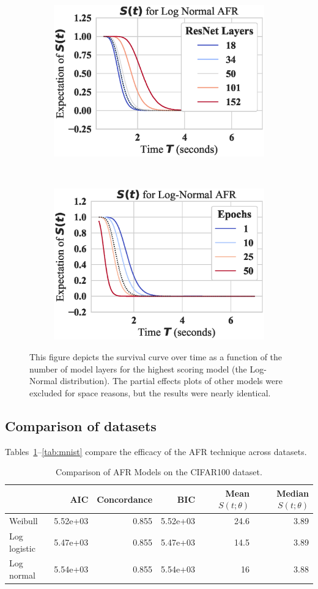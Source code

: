 \begin{figure}[!h]
    \begin{subfigure}
        \centering
        \includegraphics[width=.45\textwidth]{cifar/log_normal_layers_partial_effect.eps}
    \end{subfigure}
    ~
    \begin{subfigure}
        \centering
        \includegraphics[width=.45\textwidth]{cifar/log_normal_epochs_partial_effect.eps}
    \end{subfigure}
    \caption{This figure depicts the survival curve over time as a function of the number of model layers for the highest scoring model (the Log-Normal distribution). The partial effects plots of other models were excluded for space reasons, but the results were nearly identical.}
    \label{fig:cifar_partial_effect}
\end{figure}

\clearpage
\subsection{Comparison of datasets}
Tables~\ref{tab:cifar100}--\ref{tab:mnist} compare the efficacy of the AFR technique across datasets.

\begin{table}[!h]
\centering
\caption{Comparison of AFR Models on the CIFAR100 dataset.}
\label{tab:cifar100}
\begin{tabular}{lrrrrr}
\toprule
 & AIC & Concordance & BIC & Mean $S(t;\theta)$ & Median $S(t;\theta)$ \\
\midrule
Weibull & 5.52e+03 & 0.855 & 5.52e+03 & 24.6 & 3.89 \\
Log logistic & 5.47e+03 & 0.855 & 5.47e+03 & 14.5 & 3.89 \\
Log normal & 5.54e+03 & 0.855 & 5.54e+03 & 16 & 3.88 \\
\bottomrule
\end{tabular}
\centering
\end{table}



